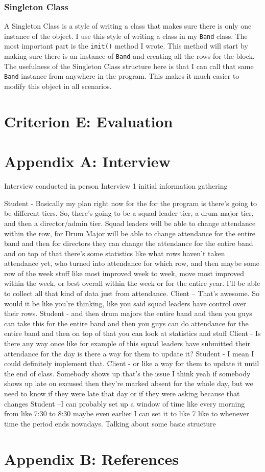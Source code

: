 \documentclass{article}
\begin{document}
\subsubsection{Singleton Class}
A Singleton Class is a style of writing a class that makes sure there is only one instance of the object. I use this style of writing a class in my \verb|Band| class. The most important part is the \verb|init()| method I wrote. This method will start by making sure there is an instance of \verb|Band| and creating all the rows for the block. The usefulness of the Singleton Class structure here is that I can call that same \verb|Band| instance from anywhere in the program. This makes it much easier to modify this object in all scenarios.
\newpage
\section{Criterion E: Evaluation}
\newpage
\section{Appendix A: Interview}
Interview conducted in person
Interview 1 initial information gathering

Student - Basically my plan right now for the for the program is there's going to be different tiers. So, there’s going to be a squad leader tier, a drum major tier, and then a director/admin tier. Squad leaders will be able to change attendance within the row, for Drum Major will be able to change attendance for the entire band and then for directors they can change the attendance for the entire band and on top of that there's some statistics like what rows haven't taken attendance yet, who turned into attendance for which row, and then maybe some row of the week stuff like most improved week to week, move most improved within the week, or best overall within the week or for the entire year. I’ll be able to collect all that kind of data just from attendance.
Client – That’s awesome. So would it be like you're thinking, like you said squad leaders have control over their rows. 
Student - and then drum majors the entire band and then you guys can take this for the entire band and then you guys can do attendance for the entire band and then on top of that you can look at statistics and stuff
Client - Is there any way once like for example of this squad leaders have submitted their attendance for the day is there a way for them to update it?
Student - I mean I could definitely implement that.
Client - or like a way for them to update it until the end of class. Somebody shows up that's the issue I think yeah if somebody shows up late on excused then they're marked absent for the whole day, but we need to know if they were late that day or if they were asking because that changes 
Student –I can probably set up a window of time like every morning from like 7:30 to 8:30 maybe even earlier I can set it to like 7 like to whenever time the period ends nowadays. Talking about some basic structure %
\newpage
\section{Appendix B: References}
{}

\end{document}
